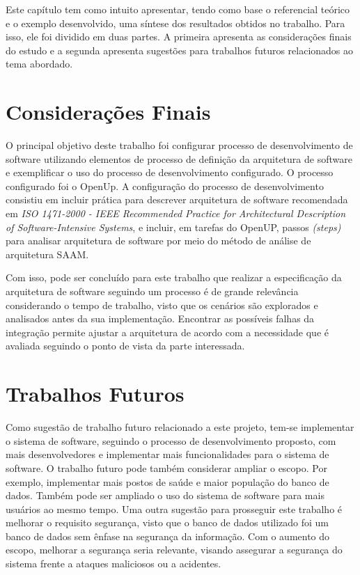 Este capítulo tem como intuito apresentar, tendo como base o referencial teórico e o exemplo desenvolvido, uma síntese dos resultados obtidos no trabalho. Para isso, ele foi dividido em duas partes. A primeira apresenta as considerações finais do estudo e a segunda apresenta sugestões para trabalhos futuros relacionados ao tema abordado.

\section{Considerações Finais}
O principal objetivo deste trabalho foi configurar processo de desenvolvimento de software utilizando elementos de processo de definição da arquitetura de software e exemplificar o uso do processo de desenvolvimento configurado. O processo configurado foi o OpenUp.  A configuração do processo de desenvolvimento consistiu em incluir prática para descrever arquitetura de software recomendada em \emph{ISO 1471-2000 - IEEE Recommended Practice for Architectural Description of Software-Intensive Systems}, e incluir, em tarefas do OpenUP, passos \emph{(steps)} para analisar arquitetura de software por meio do método de análise de arquitetura \acrfull{SAAM}.

Com isso, pode ser concluído para este trabalho que realizar a especificação da arquitetura de software seguindo um processo é de grande relevância considerando o tempo de trabalho, visto que os cenários são explorados e analisados antes da sua implementação. Encontrar as possíveis falhas da integração permite ajustar a arquitetura de acordo com a necessidade que é avaliada seguindo o ponto de vista da parte interessada.

\section{Trabalhos Futuros}

Como sugestão de trabalho futuro relacionado a este projeto, tem-se  implementar o sistema de software, seguindo o processo de desenvolvimento proposto, com mais desenvolvedores e implementar mais funcionalidades para o sistema de software. O trabalho futuro pode também considerar ampliar o escopo. Por exemplo, implementar mais postos de saúde e maior população do banco de dados. Também pode ser ampliado o uso do sistema de software para mais usuários ao mesmo tempo. Uma outra sugestão para prosseguir este trabalho é melhorar o requisito segurança, visto que o banco de dados utilizado foi um banco de dados sem ênfase na segurança da informação. Com o aumento do escopo, melhorar a segurança seria relevante, visando assegurar a segurança do sistema frente a ataques maliciosos ou a acidentes. 


